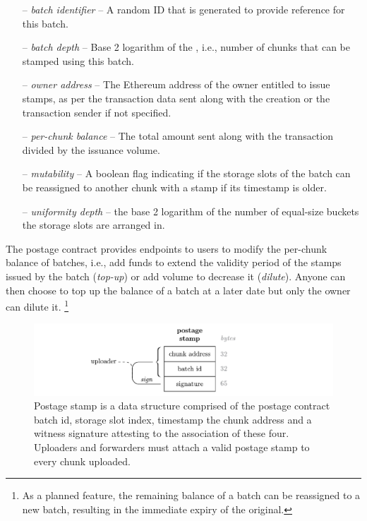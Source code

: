 \begin{itemize}[noitemsep]
\item[--] \emph{batch identifier} -- A random ID that is generated to provide reference for this batch.
\item[--] \emph{batch depth} -- Base 2 logarithm of the , i.e., number of chunks that can be stamped using this batch. 
\item[--] \emph{owner address} -- The Ethereum address of the owner entitled to issue stamps, as per the transaction data sent along with the creation or the  transaction sender if not specified.
\item[--] \emph{per-chunk balance} -- The total amount sent along with the transaction divided by the issuance volume.
\item[--] \emph{mutability} -- A boolean flag indicating if the storage slots of the batch can be reassigned to another chunk with a stamp if its timestamp is older. 
\item[--] \emph{uniformity depth} -- the base 2 logarithm of the number of equal-size buckets the storage slots are arranged in.
\end{itemize}

The postage contract provides endpoints to users to modify the per-chunk balance of batches, i.e., add funds to extend the validity period of the stamps issued by the batch (\/\emph{top-up}) or add volume to decrease it (\/\emph{dilute}).
Anyone can then choose to top up the balance of a batch at a later date but only the owner can dilute it.%
%
\footnote{As a planned feature, the remaining balance of a batch can be reassigned to a new batch, resulting in the immediate expiry of the original.}



\begin{figure}[!ht]
  \centering
    \includegraphics[width=\textwidth]{fig/postage-stamp-structure.pdf}
  \caption[Postage stamp]{Postage stamp is a data structure comprised of the postage contract batch id, storage slot index, timestamp the chunk address and a witness signature attesting to the association of these four. Uploaders and forwarders must attach a valid postage stamp to every chunk uploaded. }
  \label{fig:postage-stamp}
\end{figure}

